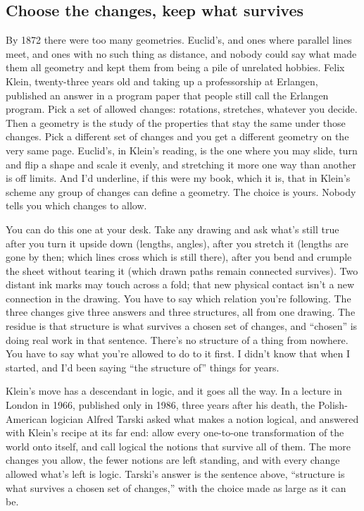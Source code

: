 \documentclass[11pt,twoside]{article}
\theoremstyle{thielethm}
\theoremstyle{thieledef}
\theoremstyle{thieledef}
\theoremstyle{thieledef}
\theoremstyle{thielethm}
\theoremstyle{thieleobs}
\theoremstyle{thielethm}
\begin{document}
\subsection{Choose the changes, keep what survives}

By 1872 there were too many geometries. Euclid's, and ones where parallel lines meet, and ones with no such thing as distance, and nobody could say what made them all geometry and kept them from being a pile of unrelated hobbies. Felix Klein, twenty-three years old and taking up a professorship at Erlangen, published an answer in a program paper that people still call the Erlangen program. Pick a set of allowed changes: rotations, stretches, whatever you decide. Then a geometry is the study of the properties that stay the same under those changes. Pick a different set of changes and you get a different geometry on the very same page. Euclid's, in Klein's reading, is the one where you may slide, turn and flip a shape and scale it evenly, and stretching it more one way than another is off limits. And I'd underline, if this were my book, which it is, that in Klein's scheme any group of changes can define a geometry. The choice is yours. Nobody tells you which changes to allow.

You can do this one at your desk. Take any drawing and ask what's still true after you turn it upside down (lengths, angles), after you stretch it (lengths are gone by then; which lines cross which is still there), after you bend and crumple the sheet without tearing it (which drawn paths remain connected survives). Two distant ink marks may touch across a fold; that new physical contact isn't a new connection in the drawing. You have to say which relation you're following. The three changes give three answers and three structures, all from one drawing. The residue is that structure is what survives a chosen set of changes, and ``chosen'' is doing real work in that sentence. There's no structure of a thing from nowhere. You have to say what you're allowed to do to it first. I didn't know that when I started, and I'd been saying ``the structure of'' things for years.

Klein's move has a descendant in logic, and it goes all the way. In a lecture in London in 1966, published only in 1986, three years after his death, the Polish- American logician Alfred Tarski asked what makes a notion logical, and answered with Klein's recipe at its far end: allow every one-to-one transformation of the world onto itself, and call logical the notions that survive all of them. The more changes you allow, the fewer notions are left standing, and with every change allowed what's left is logic. Tarski's answer is the sentence above, ``structure is what survives a chosen set of changes,'' with the choice made as large as it can be.
\end{document}
